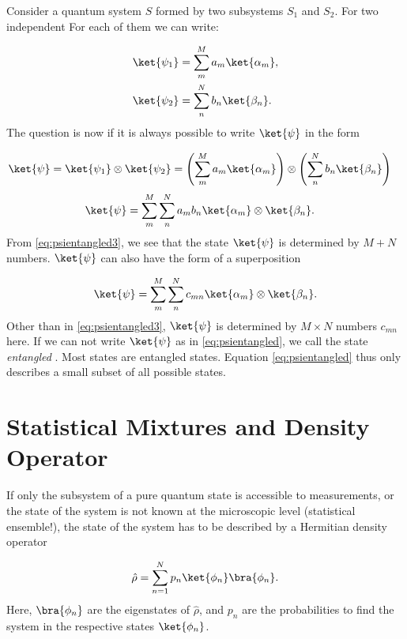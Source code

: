  
 
 
 
 
 
 Consider a quantum system $S$ formed by two subsystems $S_1$ and $S_2$. For two independent
 For each of them we can write:

\begin{align}
				\ket{\psi_1}&=\sum_m^M a_m \ket{\alpha_m},\\
				\ket{\psi_2}&=\sum_n^N b_n \ket{\beta_n}.
			
\end{align}
			The question is now if it is always possible to write $\ket{\psi}$ in the form

\begin{align}
 \label{eq:psientangled} 
	\ket{\psi}	&=\ket{\psi_1}\otimes\ket{\psi_2}=\left(\sum_m^M a_m \ket{\alpha_m}\right) \otimes \left(\sum_n^N b_n \ket{\beta_n}\right)
\end{align}
\begin{align}
\ket{\psi}	&=\sum_m^M \sum_n^N a_m b_n \ket{\alpha_m} \otimes \ket{\beta_n}. \label{eq:psientangled3} 
\end{align}
From \eqref{eq:psientangled3}, we see that the state $\ket{\psi}$ is determined by $M + N$ numbers. $\ket{\psi}$ can also have the form of a superposition

\begin{align}
\ket{\psi}=\sum_m^M \sum_n^N c_{mn}\ket{\alpha_m}\otimes \ket{\beta_n}.
\end{align}
Other than in \eqref{eq:psientangled3}, $\ket{\psi}$ is determined by $M \times N$ numbers $c_{mn}$ here. If we can not write $\ket{\psi}$ as in \eqref{eq:psientangled}, we call the state \emph{entangled} . Most states are entangled states. Equation \eqref{eq:psientangled} thus only describes a small subset of all possible states.



\section{Statistical Mixtures and Density Operator}

If only the subsystem of a pure quantum state is accessible to measurements, or the state of the system is not known at the microscopic level (statistical ensemble!), the state of the system has to be described by a Hermitian density operator

\begin{align}
 \hat{\rho} = \sum_{n=1}^N p_n \ket{\phi_n}\bra{\phi_n}.
\end{align}
Here, $\bra{\phi_n}$ are the eigenstates of $\hat{\rho}$, and $p_n$ are the probabilities to find the system in the respective states $\ket{\phi_n}$.

